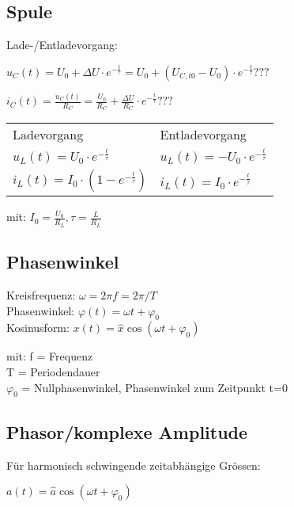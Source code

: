 \begin{sectionbox}
	\subsection{Spule}

	Lade-/Entladevorgang:
	\begin{emphbox}
		$u_C(t) = U_0+ ΔU \cdot e^{-{\frac{t}{τ}}} = U_0+ (U_{C,t0}-U_0) \cdot e^{-{\frac{t}{τ}}} ???$

		$i_C(t) = \frac{u_C(t)}{R_C} = \frac{U_0}{R_C}+\frac{ΔU}{R_C}\cdot e^{-{\frac{t}{τ}}} ???$
	\end{emphbox}

	\begin{emphbox}
		\begin{tabular}{l|l}
			Ladevorgang & Entladevorgang \\
			$u_L(t) = U_0 \cdot e^{-{\frac{t}{τ}}}$ &
			$u_L(t) = -U_0 \cdot e^{-{\frac{t}{τ}}}$ \\
			$i_L(t) = I_0 \cdot (1-e^{-{\frac{t}{τ}}})$ &
			$i_L(t) = I_0 \cdot e^{-{\frac{t}{τ}}}$ \\
		\end{tabular}
	\end{emphbox}

	mit: $I_0 = \frac{U_0}{R_L}, τ = \frac{L}{R_L}$	

	
\end{sectionbox}


\begin{sectionbox}
	\subsection{Phasenwinkel}

	\begin{emphbox}
		Kreisfrequenz: $\omega = 2\pi f = 2\pi/T$\\
		Phasenwinkel: $\varphi(t) = \omega t + \varphi_0$\\
		Kosinusform: $x(t) = \hat{x} \cos(\omega t + \varphi_0)$\\
	\end{emphbox}

		mit: f = Frequenz\\
		T = Periodendauer\\
		$\varphi_0$ = Nullphasenwinkel, Phasenwinkel zum Zeitpunkt t=0

\end{sectionbox}
	

\begin{sectionbox}
	\subsection{Phasor/komplexe Amplitude}
	Für harmonisch schwingende zeitabhängige Grössen:
	\begin{emphbox}
		$a(t) = \hat{a} \cos(\omega t + \varphi_0)$\\
	
	\end{emphbox}
\end{sectionbox}

